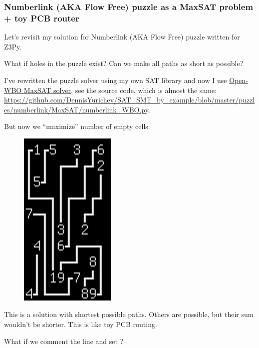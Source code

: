 \subsubsection{Numberlink (AKA Flow Free) puzzle as a MaxSAT problem + toy \ac{PCB} router}

Let's revisit my solution for Numberlink (AKA Flow Free) puzzle written for Z3Py.

What if holes in the puzzle exist?
Can we make all paths as short as possible?

I've rewritten the puzzle solver using my own SAT library 
and now I use \href{http://sat.inesc-id.pt/open-wbo/}{Open-WBO MaxSAT solver},
see the source code, which is almost the same: \url{https://github.com/DennisYurichev/SAT_SMT_by_example/blob/master/puzzles/numberlink/MaxSAT/numberlink_WBO.py}.

But now we ``maximize'' number of empty cells:


\begin{figure}[H]
\centering
\includegraphics[scale=0.5]{puzzles/numberlink/MaxSAT/MaxSAT.png}
\caption{}
\end{figure}

This is a solution with shortest possible paths. Others are possible, but their sum wouldn't be shorter.
This is like toy \ac{PCB} routing.

What if we comment the  line and set ?

